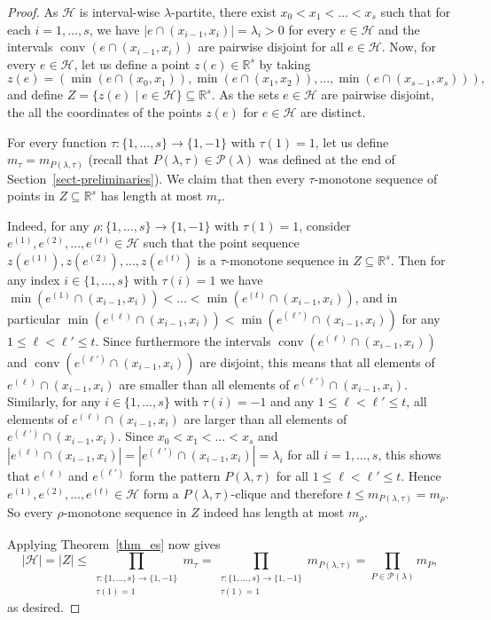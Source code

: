 \documentclass[11pt]{article}
\theoremstyle{definition}
\numberwithin{equation}{section}
\numberwithin{figure}{section}
\newcommand{\su}{\subseteq}
\newcommand{\HH}{\mathcal{H}}
\newcommand{\conv}{\operatorname{conv}}
\newcommand{\PP}{\mathcal{P}}
\begin{document}
\begin{proof} 
    As $\HH$ is interval-wise $\lambda$-partite, there exist $x_0<x_1<\dots<x_{s}$ such that for each $i=1,\dots,s$, we have $|e\cap (x_{i-1},x_i)|=\lambda_i>0$ for every $e\in \HH$ and the intervals $\conv(e\cap (x_{i-1},x_i))$ are pairwise disjoint for all $e\in \HH$. Now, for every $e\in \HH$, let us define a point $z(e)\in \mathbb{R}^s$ by taking
    \[z(e)=(\min(e\cap (x_{0},x_1)), \min(e\cap (x_{1},x_2)), \dots, \min(e\cap (x_{s-1},x_s))),\]
    and define $Z=\{ z(e)\mid e\in \HH\}\su \mathbb{R}^s$. As the sets $e\in \HH$ are pairwise disjoint, the all the coordinates of the points $z(e)$ for $e\in \HH$ are distinct.
    
    For every function $\tau:\{1,\dots,s\}\to \{1,-1\}$ with $\tau(1)=1$, let us define $m_\tau=m_{P(\lambda,\tau)}$ (recall that $P(\lambda,\tau)\in \PP(\lambda)$ was defined at the end of Section~\ref{sect-preliminaries}). We claim that then every  $\tau$-monotone sequence of points in $Z\su \mathbb{R}^s$ has length at most $m_\tau$.

    Indeed, for any $\rho:\{1,\dots,s\}\to \{1,-1\}$ with $\tau(1)=1$, consider $e^{(1)},e^{(2)},\dots,e^{(t)}\in \HH$ such that the point sequence $z(e^{(1)}),z(e^{(2)}),\dots,z(e^{(t)})$ is a $\tau$-monotone sequence in $Z \su \mathbb{R}^s$. Then for any index $i\in \{1,\dots,s\}$ with $\tau(i)=1$ we have  $\min(e^{(1)}\cap (x_{i-1},x_i))< \dots <\min(e^{(t)}\cap (x_{i-1},x_i))$, and in particular $\min(e^{(\ell)}\cap (x_{i-1},x_i))<\min(e^{(\ell')}\cap (x_{i-1},x_i))$ for any $1\le \ell<\ell'\le t$. Since furthermore the intervals $\conv(e^{(\ell)}\cap (x_{i-1},x_i))$ and $\conv(e^{(\ell')}\cap (x_{i-1},x_i))$ are disjoint, this means that all elements of $e^{(\ell)}\cap (x_{i-1},x_i)$ are smaller than all elements of $e^{(\ell')}\cap (x_{i-1},x_i)$. Similarly, for any $i\in \{1,\dots,s\}$ with $\tau(i)=-1$ and any $1\le \ell<\ell'\le t$, all elements of $e^{(\ell)}\cap (x_{i-1},x_i)$ are larger than all elements of $e^{(\ell')}\cap (x_{i-1},x_i)$. Since $x_0<x_1<\dots<x_{s}$ and $|e^{(\ell)}\cap (x_{i-1},x_i)|=|e^{(\ell')}\cap (x_{i-1},x_i)|=\lambda_i$ for all  $i=1,\dots,s$, this shows that  $e^{(\ell)}$ and $e^{(\ell')}$ form the pattern $P(\lambda,\tau)$ for all $1\le \ell<\ell'\le t$. Hence $e^{(1)},e^{(2)},\dots,e^{(t)}\in \HH$ form a $P(\lambda,\tau)$-clique and therefore $t\le m_{P(\lambda,\tau)}=m_\rho$. So every $\rho$-monotone sequence in $Z$ indeed has length at most $m_\rho$.

    Applying Theorem~\ref{thm_es} now gives
    \[|\HH|=|Z|\le \prod_{\substack{\tau:\{1,\dots,s\}\to \{1,-1\}\\ \tau(1)=1}} m_{\tau}=\prod_{\substack{\tau:\{1,\dots,s\}\to \{1,-1\}\\ \tau(1)=1}} m_{P(\lambda,\tau)}=\prod_{P\in \PP(\lambda)} m_{P},\]
    as desired.
\end{proof}
\end{document}
